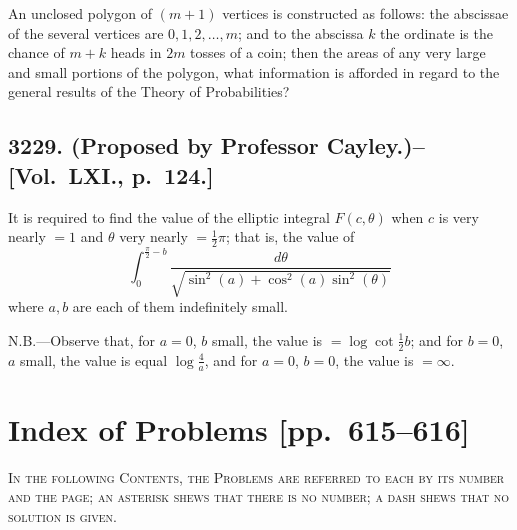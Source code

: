 \documentclass[11pt,a4paper]{book}
\begin{document}
An unclosed polygon of $(m+1)$ vertices is constructed as follows: the abscissae of the several vertices are $0,1,2,\ldots,m$; and to the abscissa $k$ the ordinate is the chance of $m+k$ heads in $2m$ tosses of a coin; then the areas of any very large and small portions of the polygon, what information is afforded in regard to the general results of the Theory of Probabilities?

\subsection*{3229. (Proposed by Professor Cayley.)\---[Vol.~LXI., p.~124.]}

It is required to find the value of the elliptic integral $F(c,\theta)$ when $c$ is very nearly $=1$ and $\theta$ very nearly $=\frac{1}{2}\pi$; that is, the value of
\[
\int_0^{\frac{\pi}{2}-b} \frac{d\theta}{\sqrt{\sin^2(a)+\cos^2(a)\sin^2(\theta)}}
\]
where $a,b$ are each of them indefinitely small.

\textsc{N.B.}---Observe that, for $a=0$, $b$ small, the value is $=\log\cot\frac{1}{2}b$; and for $b=0$, $a$ small, the value is equal $\log\frac{4}{a}$, and for $a=0$, $b=0$, the value is $=\infty$.

\newpage

\section*{Index of Problems [pp.~615--616]}

\begin{center}
\textsc{In the following Contents, the Problems are referred to each by its number and the page; an asterisk shews that there is no number; a dash shews that no solution is given.}
\end{center}

\medskip
\end{document}
